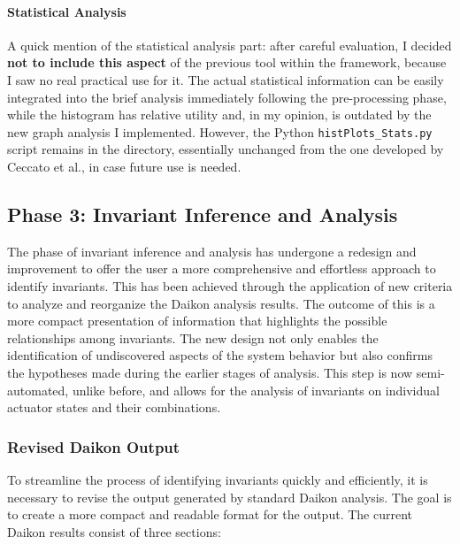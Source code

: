 \paragraph{Statistical Analysis} A quick mention of the statistical analysis part: after careful evaluation, I decided \textbf{not to include this aspect} of the previous tool within the framework, because I saw no real practical use for it. The actual statistical information can be easily integrated into the brief analysis immediately following the pre-processing phase, while the histogram has relative utility and, in my opinion, is outdated by the new graph analysis I implemented. \newline
However, the Python \texttt{histPlots\_Stats.py} script remains in the directory, essentially unchanged from the one developed by Ceccato et al., in case future use is needed. 

\subsection{Phase 3: Invariant Inference and Analysis}
\label{subsec:4_improve_invariants}
The phase of invariant inference and analysis has undergone a redesign and improvement to offer the user a more comprehensive and effortless approach to identify invariants. This has been achieved through the application of new criteria to analyze and reorganize the Daikon analysis results. The outcome of this is a more compact presentation of information that highlights the possible relationships among invariants.\newline
The new design not only enables the identification of undiscovered aspects of the system behavior but also confirms the hypotheses made during the earlier stages of analysis. This step is now semi-automated, unlike before, and allows for the analysis of invariants on individual actuator states and their combinations.
\vfill

\subsubsection{Revised Daikon Output}
\label{subsub:4_new_daikon_output}
To streamline the process of identifying invariants quickly and efficiently, it is necessary to revise the output generated by standard Daikon analysis. The goal is to create a more compact and readable format for the output.
\newline \newline
The current Daikon results consist of three sections:

